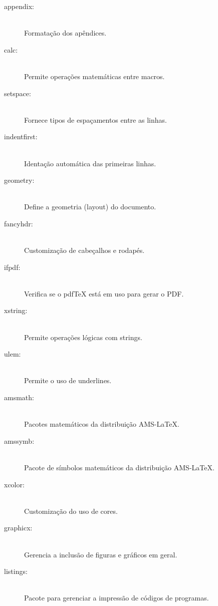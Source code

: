 \begin{description}
\item[appendix:]\hfill\\
Formatação dos apêndices.

\item[calc:]\hfill\\
Permite operações matemáticas entre macros.

\item[setspace:]\hfill\\
Fornece tipos de espaçamentos entre as linhas.

\item[indentfirst:]\hfill\\
Identação automática das primeiras linhas.

\item[geometry:]\hfill\\
Define a geometria (layout) do documento.

\item[fancyhdr:]\hfill\\
Customização de cabeçalhos e rodapés.

\item[ifpdf:]\hfill\\
Verifica se o pdfTeX está em uso para gerar o PDF.

\item[xstring:]\hfill\\
Permite operações lógicas com strings.

\item[ulem:]\hfill\\
Permite o uso de underlines.

\item[amsmath:]\hfill\\
Pacotes matemáticos da distribuição AMS-LaTeX.

\item[amssymb:]\hfill\\
Pacote de símbolos matemáticos da distribuição AMS-LaTeX.

\item[xcolor:]\hfill\\
Customização do uso de cores.

\item[graphicx:]\hfill\\
Gerencia a inclusão de figuras e gráficos em geral.

\item[listings:]\hfill\\
Pacote para gerenciar a impressão de códigos de programas.


\end{description}
